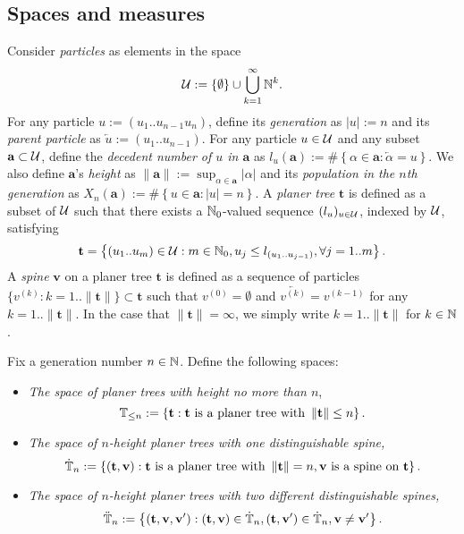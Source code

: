\documentclass[12pt]{amsart}
\theoremstyle{remark}
\numberwithin{equation}{section}
\newcommand{\defn}[1]{{\em #1}}
\newcommand{\norm}[1]{\left\| #1 \right\|}
\newcommand{\abs}[1]{\left| #1 \right|}
\newcommand{\expr}[1]{\left( #1 \right)}
\newcommand{\set}[1]{\left\{ #1 \right\}}
\newcommand{\parent}[1]{\overleftarrow{#1}}
\newcommand{\tree}{\mathbf t}
\newcommand{\spine}{\mathbf v}
\begin{document}
\subsection{Spaces and measures}
\label{sec:spacesandmeasures}
	Consider \defn{particles} as elements in the space
\begin{equation*}
		\cU
	:=
		\set{\emptyset}\cup\bigcup_{k=1}^\infty \bbN^k.
\end{equation*}
	For any particle $u:=\expr{u_1..u_{n-1}u_n}$, define its \defn{generation} as $\abs{u}:=n$ and its \defn{parent particle} as $\parent{u}:=(u_1..u_{n-1})$. For any particle $u\in\mathcal U$ and any subset $\mathbf a\subset\mathcal U$, define the \defn{decedent number of $u$ in $\mathbf a$} as $l_u(\mathbf a) := \#\set{\alpha\in \mathbf a:\parent{\alpha}=u} $. We also define $\mathbf a$'s \defn{height} as $\norm{\mathbf a}:=\sup_{\alpha\in \mathbf a}|\alpha|$ and its \defn{population in the $n$th generation} as $X_n(\mathbf a):=\#\set{u\in \mathbf a:|u|=n}$. A \defn{planer tree} $\tree$ is defined as a subset of $\mathcal U$ such that there exists a $\mathbb N_0$-valued sequence $(l_u)_{u\in \mathcal U}$, indexed by $\mathcal U$, satisfying 
\begin{equation*}
		\tree
	=
		\set{(u_1..u_m)\in \cU: m\in \bbN_0, u_j\leq l_{(u_1..u_{j-1})}, \forall j=1..m}. 
\end{equation*}
	A \defn{spine} $\spine$ on a planer tree $\tree$ is defined as a sequence of particles $\{v^{(k)}:k=1..\|\tree\|\}\subset\tree$ such that $v^{(0)}=\emptyset$ and $\parent{v^{(k)}}=v^{(k-1)}$ for any $k=1..\|\tree\|$. In the case that $\|\tree\|=\infty$, we simply write $k=1..\|\tree\|$ for $k\in\mathbb N$.
\par
	Fix a generation number $n\in \mathbb N$. Define the following spaces:
\begin{itemize}
\item 
	\defn{The space of planer trees with height no more than $n$},
\begin{equation*}
		\bbT_{\leq n}
	:=
		\set{\tree:\tree\text{ is a planer tree with }\norm{\tree}\leq n}.
\end{equation*} 
\item 
	\defn {The space of $n$-height planer trees with one distinguishable spine,}
\begin{equation*}
		\dot{\bbT}_n
	:=
		\set{(\tree,\spine):\tree \text{ is a planer tree with }\norm{\tree}=n, \spine \text{ is a spine on } \tree}.
\end{equation*}
	\item \defn{The space of $n$-height planer trees with two different distinguishable spines,}
\begin{equation*}
		\ddot{\bbT}_n
	:=
		\set{(\tree,\spine,\spine'):(\tree,\spine)\in\dot\bbT_n,(\tree,\spine')\in\dot\bbT_n,\spine\neq\spine'}.
\end{equation*}
\end{itemize}
\end{document}
